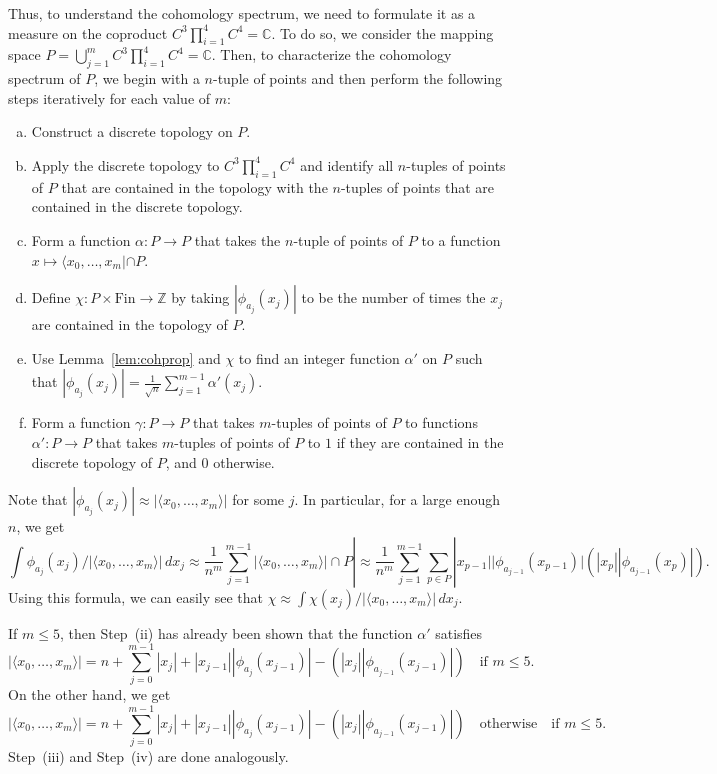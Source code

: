 \documentclass[a4paper,reqno,oneside]{article}
\begin{document}
Thus, to understand the cohomology spectrum, we need to formulate it as a measure on the coproduct $C^{3}\prod_{i=1}^4 C^{4}=\mathbb C$. To do so, we consider the mapping space $P=\bigcup_{j=1}^{m}C^{3}\prod_{i=1}^4 C^{4}=\mathbb C$. Then, to characterize the cohomology spectrum of $P$, we begin with a $n$-tuple of points and then perform the following steps iteratively for each value of $m$:
\begin{enumerate}[(a)]
    \item Construct a discrete topology on $P$. 
    \item Apply the discrete topology to $C^{3}\prod_{i=1}^4 C^{4}$ and identify all $n$-tuples of points of $P$ that are contained in the topology with the $n$-tuples of points that are contained in the discrete topology. 
    \item Form a function $\alpha\colon P\to P$ that takes the $n$-tuple of points of $P$ to a function $x\mapsto \langle x_0,\dots,x_m|\cap P$. 
    \item Define $\chi\colon P\times \text{Fin}\to\mathbb Z$ by taking $|\phi_{a_j}(x_j)|$ to be the number of times the $x_j$ are contained in the topology of $P$. 
    \item Use Lemma~\ref{lem:cohprop} and $\chi$ to find an integer function $\alpha'$ on $P$ such that $|\phi_{a_j}(x_j)|=\frac{1}{\sqrt{n}}\sum_{j=1}^{m-1}\alpha'(x_{j})$. 
    \item Form a function $\gamma\colon P\to P$ that takes $m$-tuples of points of $P$ to functions $\alpha'\colon P\to P$ that takes $m$-tuples of points of $P$ to $1$ if they are contained in the discrete topology of $P$, and $0$ otherwise. 
\end{enumerate}
Note that $|\phi_{a_j}(x_j)|\approx |\langle x_0,\dots,x_m\rangle|$ for some $j$. In particular, for a large enough $n$, we get
\[
\int \phi_{a_j}(x_j)/|\langle x_0,\dots,x_m\rangle|\,dx_j\approx \frac{1}{n^m}\sum_{j=1}^{m-1}|\langle x_0,\dots,x_m\rangle|\cap P|\approx \frac{1}{n^m}\sum_{j=1}^{m-1}\sum_{p\in P}|x_{p-1}||\phi_{a_{j-1}}(x_{p-1})|(|x_{p}||\phi_{a_{j-1}}(x_{p})|).
\]
Using this formula, we can easily see that $\chi\approx \int \chi(x_j)/|\langle x_0,\dots,x_m\rangle|\,dx_j$.

If $m\leq 5$, then Step~(ii) has already been shown that the function $\alpha'$ satisfies
\[
|\langle x_0,\dots,x_m\rangle|=n+\sum_{j=0}^{m-1}|x_j|+|x_{j-1}||\phi_{a_j}(x_{j-1})|-(|x_{j}||\phi_{a_{j-1}}(x_{j-1})|) \quad \text{if } m\leq 5.
\]
On the other hand, we get
\[
|\langle x_0,\dots,x_m\rangle|=n+\sum_{j=0}^{m-1}|x_j|+|x_{j-1}||\phi_{a_j}(x_{j-1})|-(|x_{j}||\phi_{a_{j-1}}(x_{j-1})|) \quad \text{otherwise} \quad \text{if } m\leq 5.
\]
Step~(iii) and Step~(iv) are done analogously.
\end{document}
